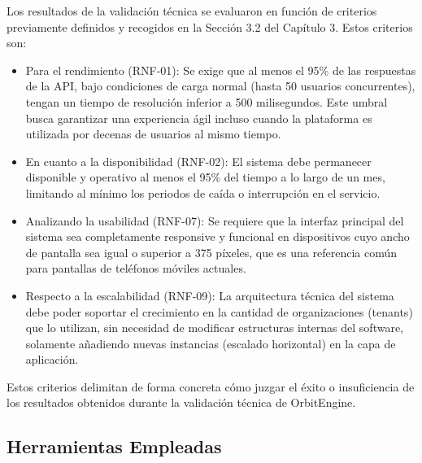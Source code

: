 Los resultados de la validación técnica se evaluaron en función de criterios previamente definidos y recogidos en la Sección 3.2 del Capítulo 3. Estos criterios son:

\begin{itemize}
\tightlist
\item
  Para el rendimiento (RNF-01): Se exige que al menos el 95\% de las respuestas de la API, bajo condiciones de carga normal (hasta 50 usuarios concurrentes), tengan un tiempo de resolución inferior a 500 milisegundos. Este umbral busca garantizar una experiencia ágil incluso cuando la plataforma es utilizada por decenas de usuarios al mismo tiempo.
\item
  En cuanto a la disponibilidad (RNF-02): El sistema debe permanecer disponible y operativo al menos el 95\% del tiempo a lo largo de un mes, limitando al mínimo los periodos de caída o interrupción en el servicio.
\item
  Analizando la usabilidad (RNF-07): Se requiere que la interfaz principal del sistema sea completamente responsive y funcional en dispositivos cuyo ancho de pantalla sea igual o superior a 375 píxeles, que es una referencia común para pantallas de teléfonos móviles actuales.
\item
  Respecto a la escalabilidad (RNF-09): La arquitectura técnica del sistema debe poder soportar el crecimiento en la cantidad de organizaciones (tenants) que lo utilizan, sin necesidad de modificar estructuras internas del software, solamente añadiendo nuevas instancias (escalado horizontal) en la capa de aplicación.
\end{itemize}

Estos criterios delimitan de forma concreta cómo juzgar el éxito o insuficiencia de los resultados obtenidos durante la validación técnica de OrbitEngine.

\subsection{Herramientas Empleadas}\label{herramientas-empleadas}

